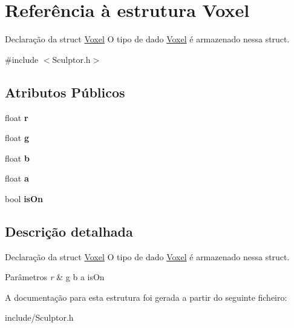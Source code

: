 \hypertarget{struct_voxel}{}\section{Referência à estrutura Voxel}
\label{struct_voxel}


Declaração da struct \hyperlink{struct_voxel}{Voxel} O tipo de dado \hyperlink{struct_voxel}{Voxel} é armazenado nessa struct.  




{\ttfamily \#include $<$Sculptor.\+h$>$}

\subsection*{Atributos Públicos}
\begin{DoxyCompactItemize}
\item 
\mbox{\label{struct_voxel_a06872ec79b836120b551a848968c0f1b}} 
float {\bfseries r}
\item 
\mbox{\label{struct_voxel_a27c0da1ed2ff430401d23ff171612a73}} 
float {\bfseries g}
\item 
\mbox{\label{struct_voxel_a5cd8432b1d7d0fd8b79e0fc7d10373a8}} 
float {\bfseries b}
\item 
\mbox{\label{struct_voxel_a3ce2579eb0a9f09a07112ce7498a638e}} 
float {\bfseries a}
\item 
\mbox{\label{struct_voxel_a6fbe8bd53f64685ac4210726d40fc775}} 
bool {\bfseries is\+On}
\end{DoxyCompactItemize}


\subsection{Descrição detalhada}
Declaração da struct \hyperlink{struct_voxel}{Voxel} O tipo de dado \hyperlink{struct_voxel}{Voxel} é armazenado nessa struct. 


\begin{DoxyParams}{Parâmetros}
{\em r} & g b a is\+On \\
\hline
\end{DoxyParams}


A documentação para esta estrutura foi gerada a partir do seguinte ficheiro\+:\begin{DoxyCompactItemize}
\item 
include/Sculptor.\+h\end{DoxyCompactItemize}
